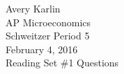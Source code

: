 \documentclass[12pt]{article}
\title{\Title}
\date{\Date}
\author{\Author}
\newcommand{\publisher}{Schweitzer Period 5}
\newcommand{\class}{AP Microeconomics}
\newcommand{\Title}{Reading Set \#1 Questions}
\newcommand{\Author}{Avery Karlin}
\newcommand{\Date}{February 4, 2016}
\begin{document}
\begin{flushleft}
\Author \\
\class \\
\publisher \\
\Date \\
\Title \\
\end{flushleft}

\end{document}
